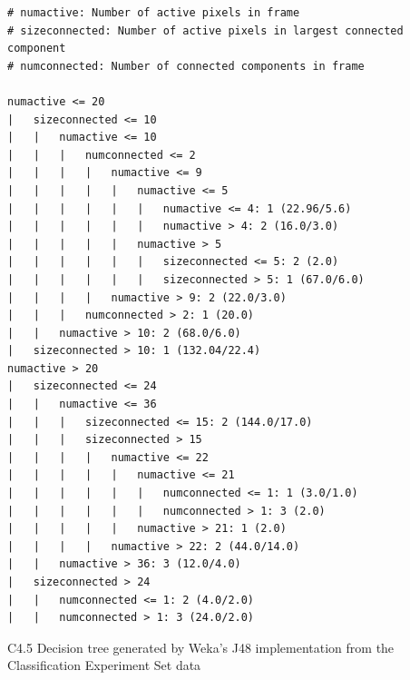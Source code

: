 \documentclass[../thesis/thesis.tex]{subfiles}
\begin{document}
\begin{listing}
\begin{verbatim}
# numactive: Number of active pixels in frame
# sizeconnected: Number of active pixels in largest connected component
# numconnected: Number of connected components in frame

numactive <= 20
|   sizeconnected <= 10
|   |   numactive <= 10
|   |   |   numconnected <= 2
|   |   |   |   numactive <= 9
|   |   |   |   |   numactive <= 5
|   |   |   |   |   |   numactive <= 4: 1 (22.96/5.6)
|   |   |   |   |   |   numactive > 4: 2 (16.0/3.0)
|   |   |   |   |   numactive > 5
|   |   |   |   |   |   sizeconnected <= 5: 2 (2.0)
|   |   |   |   |   |   sizeconnected > 5: 1 (67.0/6.0)
|   |   |   |   numactive > 9: 2 (22.0/3.0)
|   |   |   numconnected > 2: 1 (20.0)
|   |   numactive > 10: 2 (68.0/6.0)
|   sizeconnected > 10: 1 (132.04/22.4)
numactive > 20
|   sizeconnected <= 24
|   |   numactive <= 36
|   |   |   sizeconnected <= 15: 2 (144.0/17.0)
|   |   |   sizeconnected > 15
|   |   |   |   numactive <= 22
|   |   |   |   |   numactive <= 21
|   |   |   |   |   |   numconnected <= 1: 1 (3.0/1.0)
|   |   |   |   |   |   numconnected > 1: 3 (2.0)
|   |   |   |   |   numactive > 21: 1 (2.0)
|   |   |   |   numactive > 22: 2 (44.0/14.0)
|   |   numactive > 36: 3 (12.0/4.0)
|   sizeconnected > 24
|   |   numconnected <= 1: 2 (4.0/2.0)
|   |   numconnected > 1: 3 (24.0/2.0)
\end{verbatim}
\caption{C4.5 Decision tree generated by Weka's J48 implementation from the Classification Experiment Set data}
\label{lst:tree}
\end{listing}
\end{document}
